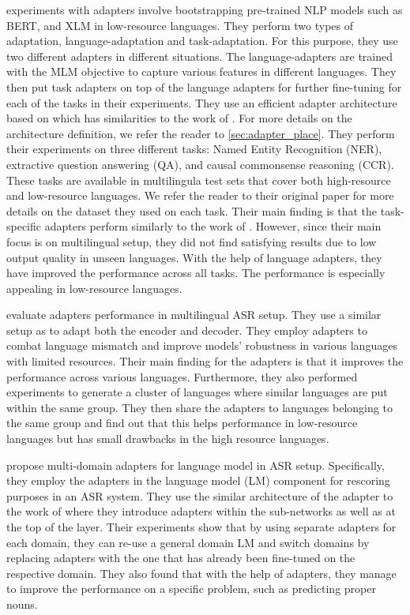  experiments with adapters involve bootstrapping pre-trained NLP models such as BERT, and XLM  in low-resource languages. They perform two types of adaptation, language-adaptation and task-adaptation. For this purpose, they use two different adapters in different situations. The language-adapters are trained with the MLM objective to capture various features in different languages. They then put task adapters on top of the language adapters for further fine-tuning for each of the tasks in their experiments. They use an efficient adapter architecture based on  which has similarities to the work of . For more details on the architecture definition, we refer the reader to \cref{sec:adapter_place}. They perform their experiments on three different tasks: Named Entity Recognition (NER), extractive question answering (QA), and causal commonsense reasoning (CCR). These tasks are available in multilingula test sets that cover both high-resource and low-resource languages. We refer the reader to their original paper for more details on the dataset they used on each task. Their main finding is that the task-specific adapters perform similarly to the work of . However, since their main focus is on multilingual setup, they did not find satisfying results due to low output quality in unseen languages. With the help of language adapters, they have improved the performance across all tasks. The performance is especially appealing in low-resource languages.

 evaluate adapters performance in multilingual ASR setup. They use a similar setup as  to adapt both the encoder and decoder. They employ adapters to combat language mismatch and improve models' robustness in various languages with limited resources. Their main finding for the adapters is that it improves the performance across various languages. Furthermore, they also performed experiments to generate a cluster of languages where similar languages are put within the same group. They then share the adapters to languages belonging to the same group and find out that this helps performance in low-resource languages but has small drawbacks in the high resource languages.

 propose multi-domain adapters for language model in ASR setup. Specifically, they employ the adapters in the language model (LM) component for rescoring purposes in an ASR system. They use the similar architecture of the adapter to the work of  where they introduce adapters within the sub-networks as well as at the top of the layer. Their experiments show that by using separate adapters for each domain, they can re-use a general domain LM and switch domains by replacing adapters with the one that has already been fine-tuned on the respective domain. They also found that with the help of adapters, they manage to improve the performance on a specific problem, such as predicting proper nouns.

